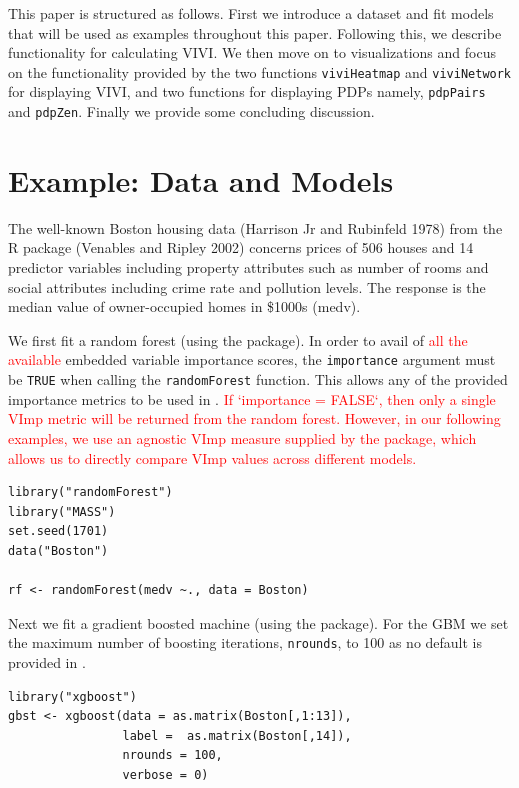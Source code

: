This paper is structured as follows. First we introduce a dataset and fit models that will be used as examples throughout this paper. Following this, we describe  functionality for calculating VIVI. We then move on to visualizations and focus on the functionality provided by the two functions \texttt{viviHeatmap} and \texttt{viviNetwork} for displaying VIVI, and two functions for displaying PDPs namely, \texttt{pdpPairs} and \texttt{pdpZen}. Finally we provide some concluding discussion.

\hypertarget{datamodel}{%
\section{Example: Data and Models}\label{datamodel}}

The well-known Boston housing data (Harrison Jr and Rubinfeld 1978) from the R package  (Venables and Ripley 2002) concerns prices of 506 houses and 14 predictor variables including property attributes such as number of rooms and social attributes including crime rate and pollution levels. The response is the median value of owner-occupied homes in \$1000s (medv).

We first fit a random forest (using the  package). In order to avail of \textcolor{red}{all the available} embedded variable importance scores, the \texttt{importance} argument must be \texttt{TRUE} when calling the \texttt{randomForest} function. This allows any of the provided importance metrics to be used in . \textcolor{red}{If `importance = FALSE`, then only a single VImp metric will be returned from the random forest. However, in our following examples, we use an agnostic VImp measure supplied by the  package, which allows us to directly compare VImp values across different models.}

\begin{verbatim}
library("randomForest") 
library("MASS")
set.seed(1701)  
data("Boston")

rf <- randomForest(medv ~., data = Boston)
\end{verbatim}

Next we fit a gradient boosted machine (using the  package). For the GBM we set the maximum number of boosting iterations, \texttt{nrounds}, to 100 as no default is provided in .

\begin{verbatim}
library("xgboost") 
gbst <- xgboost(data = as.matrix(Boston[,1:13]), 
                label =  as.matrix(Boston[,14]),
                nrounds = 100,
                verbose = 0)
\end{verbatim}

